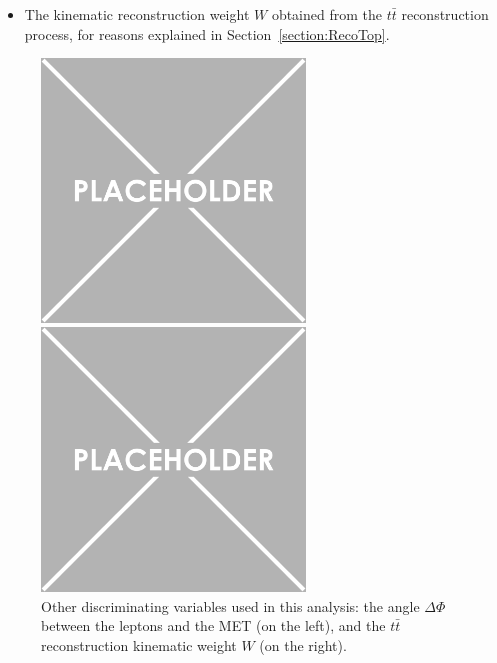 \documentclass[a4paper, 10pt, openright]{report}
\begin{document}
\begin{itemize}
\begin{minipage}[c]{.32\linewidth}
{	}
   \end{minipage} \hfill
   \label{fig:scheme_deltaphi}

\item The kinematic reconstruction weight $W$ obtained from the $t \bar t$ reconstruction process, for reasons explained in Section~\ref{section:RecoTop}.
\end{itemize}

\begin{figure}[htbp]
\centering
\begin{minipage}[b]{.48\textwidth}
\includegraphics[width=7cm, height=7cm]{figs/placeholder.png}
\end{minipage}\hfill
\begin{minipage}[b]{.48\textwidth}
\includegraphics[width=7cm, height=7cm]{figs/placeholder.png}
\end{minipage} \hfill
\caption{Other discriminating variables used in this analysis: the angle $\Delta \Phi$ between the leptons and the \ac{MET} (on the left), and the $t \bar t$ reconstruction kinematic weight $W$ (on the right).}
\label{fig:SRdisc3}
\end{figure}
\end{document}
